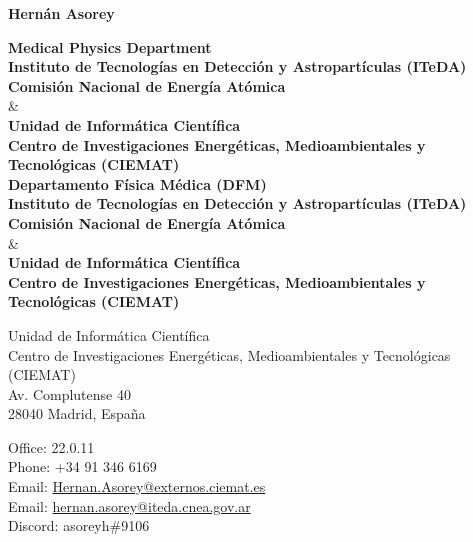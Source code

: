 \begin{center}{\huge \bf Hernán Asorey}\\[1cm]\end{center}

\begin{center}
\ifeng
	{\bf{Medical Physics Department}} \\
	{\bf{Instituto de Tecnologías en Detección y Astropartículas (ITeDA)}} \\
	{\bf{Comisión Nacional de Energía Atómica}}\\
	\& \\
	{\bf{Unidad de Informática Científica}}\\
	{\bf{Centro de Investigaciones Energéticas, Medioambientales y Tecnológicas (CIEMAT)}}\\
\else
	{\bf{Departamento Física Médica (DFM)}} \\
	{\bf{Instituto de Tecnologías en Detección y Astropartículas (ITeDA)}} \\
	{\bf{Comisión Nacional de Energía Atómica}}\\
	\& \\
	{\bf{Unidad de Informática Científica}}\\
	{\bf{Centro de Investigaciones Energéticas, Medioambientales y Tecnológicas (CIEMAT)}}\\
\fi
\end{center}
\begin{minipage}[t]{0.55\textwidth}
Unidad de Informática Científica\\
Centro de Investigaciones Energéticas, Medioambientales y Tecnológicas (CIEMAT)\\
Av. Complutense 40\\
28040 Madrid, España\\[.2cm]
\end{minipage}\hspace*{0.02\textwidth}
\begin{minipage}[t]{0.45\textwidth}
Office: 22.0.11\\
Phone: +34 91 346 6169\\
Email: \href{mailto:Hernan.Asorey@externos.ciemat.es}{Hernan.Asorey@externos.ciemat.es}\\
Email: \href{mailto:hernan.asorey@iteda.cnea.gov.ar}{hernan.asorey@iteda.cnea.gov.ar}\\
Discord: asoreyh\#9106\\
\end{minipage}

